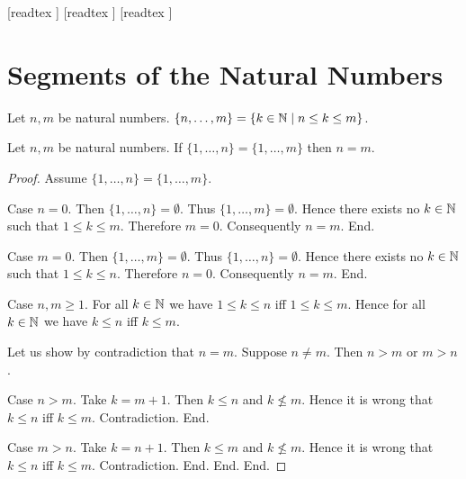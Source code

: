 \documentclass[10pt]{article}
\begin{document}
  \begin{imports}
    \begin{forthel}
      [readtex ]
      [readtex ]
      [readtex ]
    \end{forthel}
  \end{imports}


  \section{Segments of the Natural Numbers}

  \begin{forthel}
    \begin{definition}
      Let $n, m$ be natural numbers.
      $\{ n, \dots, m \} = \{ k \in \mathbb{N} \mid n \leq k \leq m \}$.
    \end{definition}
  \end{forthel}

  \begin{forthel}
    \begin{proposition}
      Let $n, m$ be natural numbers.
      If $\{ 1, \dots, n \} = \{ 1, \dots, m \}$ then $n = m$.
    \end{proposition}
    \begin{proof}
      Assume $\{ 1, \dots, n \} = \{ 1, \dots, m \}$.

      Case $n = 0$.
        Then $\{ 1, \dots, n \} = \emptyset$.
        Thus $\{ 1, \dots, m \} = \emptyset$.
        Hence there exists no $k \in \mathbb{N}$ such that $1 \leq k \leq m$.
        Therefore $m = 0$.
        Consequently $n = m$.
      End.

      Case $m = 0$.
        Then $\{ 1, \dots, m \} = \emptyset$.
        Thus $\{ 1, \dots, n \} = \emptyset$.
        Hence there exists no $k \in \mathbb{N}$ such that $1 \leq k \leq n$.
        Therefore $n = 0$.
        Consequently $n = m$.
      End.

      Case $n, m \geq 1$.
        For all $k \in \mathbb{N}$ we have $1 \leq k \leq n$ iff $1 \leq k \leq m$.
        Hence for all $k \in \mathbb{N}$ we have $k \leq n$ iff $k \leq m$.

        Let us show by contradiction that $n = m$.
          Suppose $n \neq m$.
          Then $n > m$ or $m > n$.

          Case $n > m$.
            Take $k = m + 1$.
            Then $k \leq n$ and $k \nleq m$.
            Hence it is wrong that $k \leq n$ iff $k \leq m$.
            Contradiction.
          End.

          Case $m > n$.
            Take $k = n + 1$.
            Then $k \leq m$ and $k \nleq m$.
            Hence it is wrong that $k \leq n$ iff $k \leq m$.
            Contradiction.
          End.
        End.
      End.
    \end{proof}
  \end{forthel}
\end{document}
